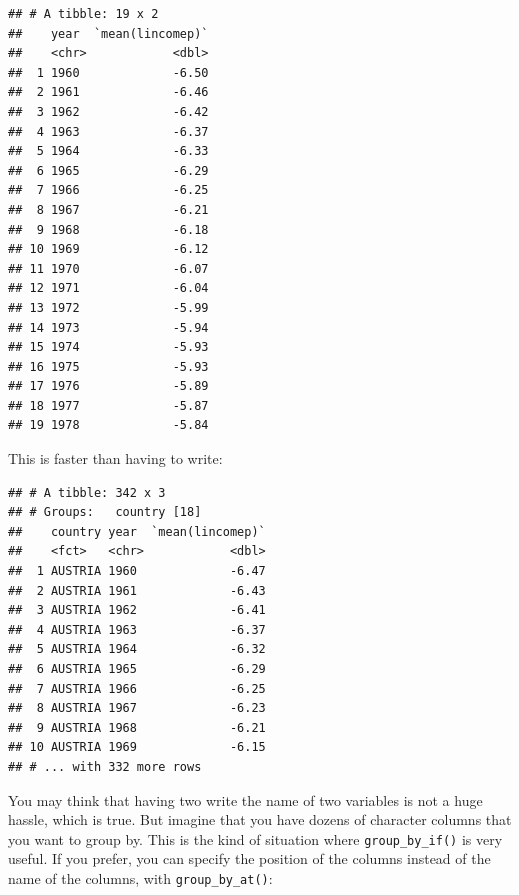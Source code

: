 \documentclass[]{gitbook}
\newenvironment{Shaded}{\begin{snugshade}}{\end{snugshade}}
\newcommand{\KeywordTok}[1]{\textcolor[rgb]{0.13,0.29,0.53}{\textbf{#1}}}
\newcommand{\NormalTok}[1]{#1}
\newcommand{\OperatorTok}[1]{\textcolor[rgb]{0.81,0.36,0.00}{\textbf{#1}}}
\newcommand{\StringTok}[1]{\textcolor[rgb]{0.31,0.60,0.02}{#1}}
\begin{document}
\begin{Shaded}
\end{Shaded}

\begin{verbatim}
## # A tibble: 19 x 2
##    year  `mean(lincomep)`
##    <chr>            <dbl>
##  1 1960             -6.50
##  2 1961             -6.46
##  3 1962             -6.42
##  4 1963             -6.37
##  5 1964             -6.33
##  6 1965             -6.29
##  7 1966             -6.25
##  8 1967             -6.21
##  9 1968             -6.18
## 10 1969             -6.12
## 11 1970             -6.07
## 12 1971             -6.04
## 13 1972             -5.99
## 14 1973             -5.94
## 15 1974             -5.93
## 16 1975             -5.93
## 17 1976             -5.89
## 18 1977             -5.87
## 19 1978             -5.84
\end{verbatim}

This is faster than having to write:

\begin{Shaded}
\end{Shaded}

\begin{verbatim}
## # A tibble: 342 x 3
## # Groups:   country [18]
##    country year  `mean(lincomep)`
##    <fct>   <chr>            <dbl>
##  1 AUSTRIA 1960             -6.47
##  2 AUSTRIA 1961             -6.43
##  3 AUSTRIA 1962             -6.41
##  4 AUSTRIA 1963             -6.37
##  5 AUSTRIA 1964             -6.32
##  6 AUSTRIA 1965             -6.29
##  7 AUSTRIA 1966             -6.25
##  8 AUSTRIA 1967             -6.23
##  9 AUSTRIA 1968             -6.21
## 10 AUSTRIA 1969             -6.15
## # ... with 332 more rows
\end{verbatim}

You may think that having two write the name of two variables is not a huge hassle, which is true.
But imagine that you have dozens of character columns that you want to group by. This is the kind
of situation where \texttt{group\_by\_if()} is very useful. If you prefer, you can specify the position of
the columns instead of the name of the columns, with \texttt{group\_by\_at()}:
\end{document}
